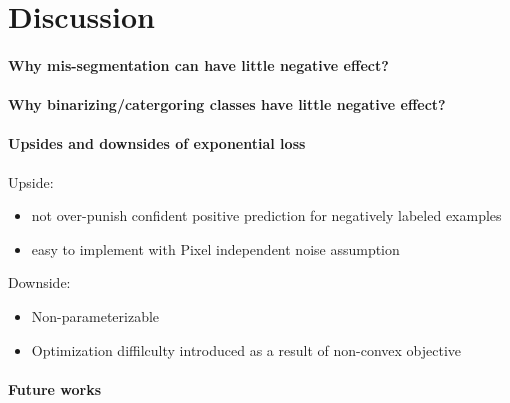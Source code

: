\section{Discussion}
\label{sec:discussion}

\paragraph{Why mis-segmentation can have little negative effect?}


\paragraph{Why binarizing/catergoring classes have little negative effect?}

\paragraph{Upsides and downsides of exponential loss}
Upside:
\begin{itemize}
  \item not over-punish confident positive prediction for negatively labeled examples
  \item easy to implement with Pixel independent noise assumption
\end{itemize}


Downside:
\begin{itemize}
  \item Non-parameterizable
  \item Optimization diffilculty introduced as a result of non-convex objective
\end{itemize}


\paragraph{Future works}
